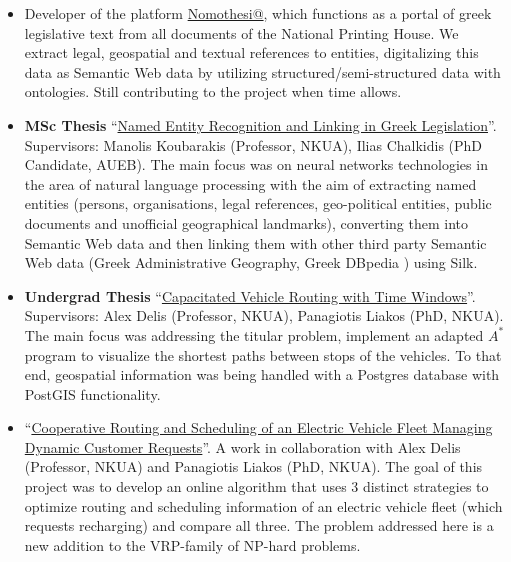 \documentclass[a4paper,oneside,11pt]{article}
\begin{document}
\begin{itemize}

\item Developer of the platform \href{http://legislation.di.uoa.gr/}{Nomothesi@}, which functions as a portal of greek legislative text from all documents of the National Printing House. We extract legal, geospatial and textual references to entities, digitalizing this data as Semantic Web data by utilizing structured/semi-structured data with ontologies. Still contributing to the project when time allows.

\item \begin{sloppypar}
\textbf{MSc Thesis} ``\href{https://pergamos.lib.uoa.gr/uoa/dl/frontend/en/browse/2766525}{Named Entity Recognition and Linking in Greek Legislation}''. Supervisors: Manolis Koubarakis (Professor, NKUA), Ilias Chalkidis (PhD Candidate, AUEB).
The main focus was on neural networks technologies in the area of natural language processing with the aim of extracting named entities (persons, organisations, legal references, geo-political entities, public documents and unofficial geographical landmarks), 
converting them into Semantic Web data and then linking them with other third party Semantic Web data (Greek Administrative Geography, Greek DBpedia ) using Silk.

\end{sloppypar}

\item \begin{sloppypar}
\textbf{Undergrad Thesis} ``\href{http://efessos.lib.uoa.gr/applications/disserts.nsf/0f1ab5fee83fbb88c225770c0042ce4f/8da6d56136caaacec2257ea6004c9349?OpenDocument}{Capacitated Vehicle Routing with Time Windows}''. Supervisors: Alex Delis (Professor, NKUA), Panagiotis Liakos (PhD, NKUA). 
The main focus was addressing the titular problem, implement an adapted $A^{*}$ program to visualize the shortest paths between stops of the vehicles. To that end, geospatial information was being handled with a Postgres database with PostGIS functionality.

\end{sloppypar}

\item \begin{sloppypar}
``\href{https://bitbucket.org/Metimdjai/vrppd/src/master/}{Cooperative Routing and Scheduling of an Electric Vehicle Fleet Managing Dynamic Customer Requests}''. A work in collaboration with Alex Delis (Professor, NKUA) and Panagiotis Liakos (PhD, NKUA). 
The goal of this project was to develop an online algorithm that uses 3 distinct strategies to optimize routing and scheduling information of an electric vehicle fleet (which requests recharging) and compare all three. The problem addressed here is a new addition to the VRP-family of NP-hard problems.


\end{sloppypar}
\end{itemize}
\end{document}
